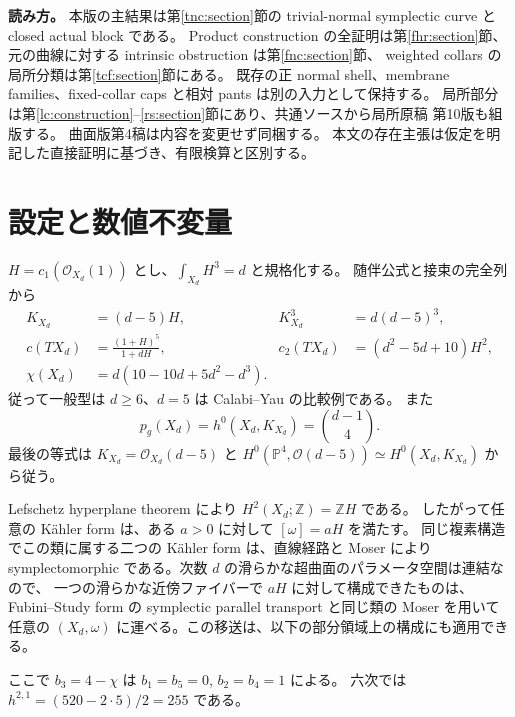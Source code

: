 \documentclass[11pt,a4paper]{article}
\theoremstyle{definition}
\newcommand{\PP}{\mathbb P}
\newcommand{\ZZ}{\mathbb Z}
\begin{document}
\clearpage
\begingroup
\small
\setlength{\parskip}{0pt}
\makeatletter
\renewcommand*{\@pnumwidth}{2.2em}
\renewcommand*{\@tocrmarg}{3.2em}
\renewcommand*{\l@section}[2]{\@dottedtocline{1}{0em}{3.4em}{\bfseries #1}{\bfseries #2}}
\makeatother
\tableofcontents
\endgroup
\medskip
\noindent\textbf{読み方。}
本版の主結果は第\ref{tnc:section}節の trivial-normal symplectic curve と closed actual block である。
Product construction の全証明は第\ref{fhr:section}節、
元の曲線に対する intrinsic obstruction は第\ref{fnc:section}節、
weighted collars の局所分類は第\ref{tcf:section}節にある。
既存の正 normal shell、membrane families、fixed-collar caps と相対 pants は別の入力として保持する。
局所部分は第\ref{lc:construction}--\ref{rs:section}節にあり、共通ソースから局所原稿 第10版も組版する。
曲面版第4稿は内容を変更せず同梱する。
本文の存在主張は仮定を明記した直接証明に基づき、有限検算と区別する。

\clearpage

\section{設定と数値不変量}\label{sec:invariants}

$H=c_1(\mathcal O_{X_d}(1))$ とし、$\int_{X_d}H^3=d$ と規格化する。
随伴公式と接束の完全列から
\begin{align}
K_{X_d}&=(d-5)H,& K_{X_d}^3&=d(d-5)^3,\label{eq:canonical}\\
c(TX_d)&=\frac{(1+H)^5}{1+dH},&
c_2(TX_d)&=(d^2-5d+10)H^2,\nonumber\\
\chi(X_d)&=d(10-10d+5d^2-d^3).\label{eq:chern-euler}
\end{align}
従って一般型は $d\ge6$、$d=5$ は Calabi--Yau の比較例である。
また
\[
p_g(X_d)=h^0(X_d,K_{X_d})=\binom{d-1}{4}.
\]
最後の等式は $K_{X_d}=\mathcal O_{X_d}(d-5)$ と
$H^0(\PP^4,\mathcal O(d-5))\simeq H^0(X_d,K_{X_d})$ から従う。

Lefschetz hyperplane theorem により $H^2(X_d;\ZZ)=\ZZ H$ である。
したがって任意の Kähler form は、ある $a>0$ に対して $[\omega]=aH$ を満たす。
同じ複素構造でこの類に属する二つの Kähler form は、直線経路と Moser により
symplectomorphic である。次数 $d$ の滑らかな超曲面のパラメータ空間は連結なので、
一つの滑らかな近傍ファイバーで $aH$ に対して構成できたものは、
Fubini--Study form の symplectic parallel transport と同じ類の Moser を用いて
任意の $(X_d,\omega)$ に運べる。この移送は、以下の部分領域上の構成にも適用できる。


ここで $b_3=4-\chi$ は $b_1=b_5=0$, $b_2=b_4=1$ による。
六次では $h^{2,1}=(520-2\cdot5)/2=255$ である。
\end{document}
